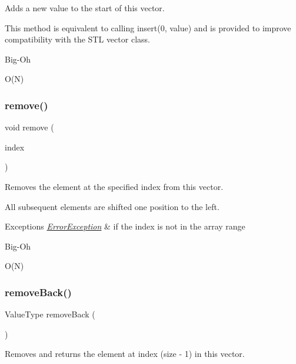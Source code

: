 Adds a new value to the start of this vector. 

This method is equivalent to calling insert(0, value) and is provided to improve compatibility with the S\+TL {\ttfamily vector} class. \begin{DoxyRefDesc}{Big-\/\+Oh}
\item[\mbox{\hyperlink{BigOh__BigOh000126}{Big-\/\+Oh}}]O(\+N) \end{DoxyRefDesc}
\mbox{\label{classVector_a2ad1aa316f278b2e9fa8121504749652}} 
\subsubsection{\texorpdfstring{remove()}{remove()}}
{\footnotesize\ttfamily void remove (\begin{DoxyParamCaption}\item[{int}]{index }\end{DoxyParamCaption})}



Removes the element at the specified index from this vector. 

All subsequent elements are shifted one position to the left. 
\begin{DoxyExceptions}{Exceptions}
{\em \mbox{\hyperlink{classErrorException}{Error\+Exception}}} & if the index is not in the array range \\
\hline
\end{DoxyExceptions}
\begin{DoxyRefDesc}{Big-\/\+Oh}
\item[\mbox{\hyperlink{BigOh__BigOh000127}{Big-\/\+Oh}}]O(\+N) \end{DoxyRefDesc}
\mbox{\label{classVector_af7878e9c2f67e06cbae525e9fa77e38e}} 
\subsubsection{\texorpdfstring{remove\+Back()}{removeBack()}}
{\footnotesize\ttfamily Value\+Type remove\+Back (\begin{DoxyParamCaption}{ }\end{DoxyParamCaption})}



Removes and returns the element at index (size -\/ 1) in this vector. 


